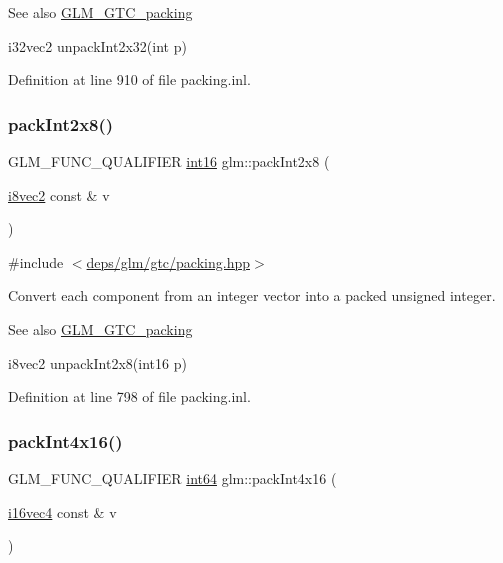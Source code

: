 \begin{DoxySeeAlso}{See also}
\hyperlink{group__gtc__packing}{G\+L\+M\+\_\+\+G\+T\+C\+\_\+packing} 

i32vec2 unpack\+Int2x32(int p) 
\end{DoxySeeAlso}


Definition at line 910 of file packing.\+inl.

\mbox{\label{group__gtc__packing_ga532b06d8915c6c65649f828e9106a1d9}} 
\subsubsection{\texorpdfstring{pack\+Int2x8()}{packInt2x8()}}
{\footnotesize\ttfamily G\+L\+M\+\_\+\+F\+U\+N\+C\+\_\+\+Q\+U\+A\+L\+I\+F\+I\+ER \hyperlink{group__gtc__type__precision_ga2945a61d12771f8954994fcddf02b021}{int16} glm\+::pack\+Int2x8 (\begin{DoxyParamCaption}\item[{\hyperlink{group__gtc__type__precision_gade57e4b55fe2b2345a4f2ac2b149cd32}{i8vec2} const \&}]{v }\end{DoxyParamCaption})}



{\ttfamily \#include $<$\hyperlink{gtc_2packing_8hpp}{deps/glm/gtc/packing.\+hpp}$>$}

Convert each component from an integer vector into a packed unsigned integer.

\begin{DoxySeeAlso}{See also}
\hyperlink{group__gtc__packing}{G\+L\+M\+\_\+\+G\+T\+C\+\_\+packing} 

i8vec2 unpack\+Int2x8(int16 p) 
\end{DoxySeeAlso}


Definition at line 798 of file packing.\+inl.

\mbox{\label{group__gtc__packing_gac3ef78d62735b5c34503c33e37e401c2}} 
\subsubsection{\texorpdfstring{pack\+Int4x16()}{packInt4x16()}}
{\footnotesize\ttfamily G\+L\+M\+\_\+\+F\+U\+N\+C\+\_\+\+Q\+U\+A\+L\+I\+F\+I\+ER \hyperlink{group__gtc__type__precision_ga435d75819cce297cc5fa21bd84ef89a5}{int64} glm\+::pack\+Int4x16 (\begin{DoxyParamCaption}\item[{\hyperlink{group__gtc__type__precision_ga99a249a4cc129cb527c48d3afd38b666}{i16vec4} const \&}]{v }\end{DoxyParamCaption})}



